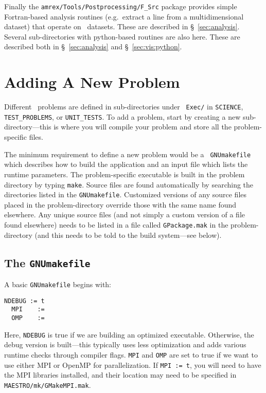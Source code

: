 Finally the {\tt amrex/Tools/Postprocessing/F\_Src} package provides simple
Fortran-based analysis routines (e.g.\ extract a line from a
multidimensional dataset) that operate on \amrex\ datasets.  These are
described in \S~\ref{sec:analysis}.  Several sub-directories with
python-based routines are also here.  These are described both in
\S~\ref{sec:analysis} and \S~\ref{sec:vis:python}.





\section{Adding A New Problem}
\label{sec:adding_problems}

Different \maestro\ problems are defined in sub-directories under {\tt
  Exec/} in {\tt SCIENCE}, {\tt TEST\_PROBLEMS}, or {\tt UNIT\_TESTS}.
To add a problem, start by creating a new sub-directory---this is
where you will compile your problem and store all the problem-specific
files.

The minimum requirement to define a new problem would be a {\tt
  GNUmakefile} which describes how to build the application and an
input file which lists the runtime parameters.  The problem-specific
executable is built in the problem directory by typing {\tt make}.
Source files are found automatically by searching the directories
listed in the {\tt GNUmakefile}.  Customized versions of any source
files placed in the problem-directory override those with the same
name found elsewhere.  Any unique source files (and not simply a
custom version of a file found elsewhere) needs to be listed in a file
called {\tt GPackage.mak} in the problem-directory (and this needs to
be told to the build system---see below).

\subsection{The {\tt GNUmakefile}}

\label{sec:makefile}

A basic {\tt GNUmakefile} begins with:
\begin{lstlisting}[language={[gnu]make},mathescape=false]
  NDEBUG := t
  MPI    :=
  OMP    :=
\end{lstlisting}
Here, {\tt NDEBUG} is true if we are building an optimized executable.
Otherwise, the debug version is built---this typically uses less
optimization and adds various runtime checks through compiler flags.
{\tt MPI} and {\tt OMP} are set to true if we want to use either MPI
or OpenMP for parallelization.  If {\tt MPI := t}, you will need to
have the MPI libraries installed, and their location may need to be 
specified in {\tt MAESTRO/mk/GMakeMPI.mak}.

